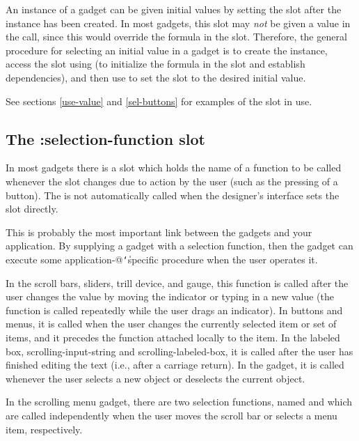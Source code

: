 An instance of a gadget can be given initial
values by setting the  slot after the instance has been
created.  In most gadgets, this slot may
{\it not} be given a value in the  call, since this
would override the formula in the slot.  Therefore, the general
procedure for selecting an initial value in a gadget is to create the
instance, access the  slot using  (to
initialize the formula in the slot and establish dependencies), and
then use  to set the slot to the desired initial value.

See sections \ref{use-value} and \ref{sel-buttons} for examples of the
 slot in use.

\subsection{The :selection-function slot}
\label{sel-fn}
In most gadgets there is a
 slot which holds the name of a function to be
called whenever the  slot changes due to action by the user
(such as the pressing of a button).  The  is
not automatically called when the designer's interface sets the
 slot directly.

This is probably the most important link between the gadgets and your
application.  By supplying a gadget with a selection function, then
the gadget can execute some application-@{\tt\char`\|}specific procedure when the
user operates it.

In the scroll bars, sliders, trill device, and gauge, this function is
called after the user changes the value by moving the indicator or
typing in a new value (the function is called repeatedly while the
user drags an indicator).  In buttons and menus, it is called when the
user changes the currently selected item or set of items, and it
precedes the function attached locally to the item.  In the labeled
box, scrolling-input-string and scrolling-labeled-box, it is called
after the user has finished editing the text (i.e., after a carriage
return).  In the  gadget, it is called
whenever the user selects a new object or deselects the current
object.

In the scrolling menu gadget, there are two selection functions, named
 and 
which are called independently when the user moves the scroll bar or
selects a menu item, respectively.

